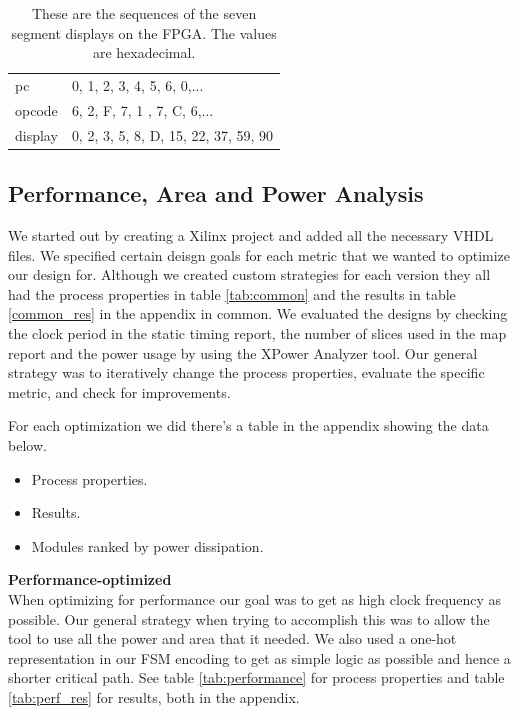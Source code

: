 \documentclass[a4paper,11pt]{article}
\begin{document}
\begin{table}[h!]
\centering
\begin{tabular}{|l|l|} \hline
  pc & 0, 1, 2, 3, 4, 5, 6, 0,...\\
  opcode & 6, 2, F, 7, 1 , 7, C, 6,... \\
  display & 0, 2, 3, 5, 8, D, 15, 22, 37, 59, 90\\ \hline
\end{tabular}
\label{tab:sequences}
\caption{These are the sequences of the seven segment displays on the FPGA. The values are hexadecimal.}
\end{table}

\newpage
\subsection{Performance, Area and Power Analysis}

We started out by creating a Xilinx project and added all the necessary VHDL files. We specified certain deisgn goals for each metric that we wanted to optimize our design for. Although we created custom strategies for each version they all had the process properties in table \ref{tab:common} and the results in table \ref{common_res} in the appendix in common. We evaluated the designs by checking the clock period in the static timing report, the number of slices used in the map report and the power usage by using the XPower Analyzer tool. Our general strategy was to iteratively change the process properties, evaluate the specific metric, and check for improvements. 

For each optimization we did there's a table in the appendix showing the data below. 
\begin{itemize}
  \item Process properties.
  \item Results.
  \item Modules ranked by power dissipation.
\end{itemize}

\textbf{Performance-optimized} \\
When optimizing for performance our goal was to get as high clock frequency as possible. Our general strategy when trying to accomplish this was to allow the tool to use all the power and area that it needed. We also used a one-hot representation in our FSM encoding to get as simple logic as possible and hence a shorter critical path. See table \ref{tab:performance} for process properties and table \ref{tab:perf_res} for results, both in the appendix.
\end{document}
